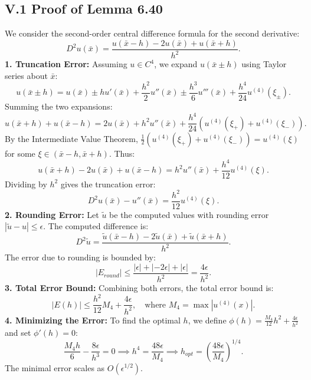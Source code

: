 \documentclass[a4paper]{article}
\begin{document}
\subsection*{V.1 Proof of Lemma 6.40}
We consider the second-order central difference formula for the second derivative:
\[
D^2u(\bar{x}) = \frac{u(\bar{x}-h) - 2u(\bar{x}) + u(\bar{x}+h)}{h^2}.
\]
\textbf{1. Truncation Error:}
Assuming $u \in C^4$, we expand $u(\bar{x} \pm h)$ using Taylor series about $\bar{x}$:
\[
u(\bar{x} \pm h) = u(\bar{x}) \pm h u'(\bar{x}) + \frac{h^2}{2} u''(\bar{x}) \pm \frac{h^3}{6} u'''(\bar{x}) + \frac{h^4}{24} u^{(4)}(\xi_\pm).
\]
Summing the two expansions:
\[
u(\bar{x}+h) + u(\bar{x}-h) = 2u(\bar{x}) + h^2 u''(\bar{x}) + \frac{h^4}{24} (u^{(4)}(\xi_+) + u^{(4)}(\xi_-)).
\]
By the Intermediate Value Theorem, $\frac{1}{2}(u^{(4)}(\xi_+) + u^{(4)}(\xi_-)) = u^{(4)}(\xi)$ for some $\xi \in (\bar{x}-h, \bar{x}+h)$. Thus:
\[
u(\bar{x}+h) - 2u(\bar{x}) + u(\bar{x}-h) = h^2 u''(\bar{x}) + \frac{h^4}{12} u^{(4)}(\xi).
\]
Dividing by $h^2$ gives the truncation error:
\[
D^2u(\bar{x}) - u''(\bar{x}) = \frac{h^2}{12} u^{(4)}(\xi).
\]
\textbf{2. Rounding Error:}
Let $\tilde{u}$ be the computed values with rounding error $|\tilde{u} - u| \le \epsilon$. The computed difference is:
\[
D^2\tilde{u} = \frac{\tilde{u}(\bar{x}-h) - 2\tilde{u}(\bar{x}) + \tilde{u}(\bar{x}+h)}{h^2}.
\]
The error due to rounding is bounded by:
\[
|E_{round}| \le \frac{|\epsilon| + |-2\epsilon| + |\epsilon|}{h^2} = \frac{4\epsilon}{h^2}.
\]
\textbf{3. Total Error Bound:}
Combining both errors, the total error bound is:
\[
|E(h)| \le \frac{h^2}{12} M_4 + \frac{4\epsilon}{h^2}, \quad \text{where } M_4 = \max |u^{(4)}(x)|.
\]
\textbf{4. Minimizing the Error:}
To find the optimal $h$, we define $\phi(h) = \frac{M_4}{12} h^2 + \frac{4\epsilon}{h^2}$ and set $\phi'(h) = 0$:
\[
\frac{M_4 h}{6} - \frac{8\epsilon}{h^3} = 0 \implies h^4 = \frac{48\epsilon}{M_4} \implies h_{opt} = \left( \frac{48\epsilon}{M_4} \right)^{1/4}.
\]
The minimal error scales as $O(\epsilon^{1/2})$.
\end{document}
